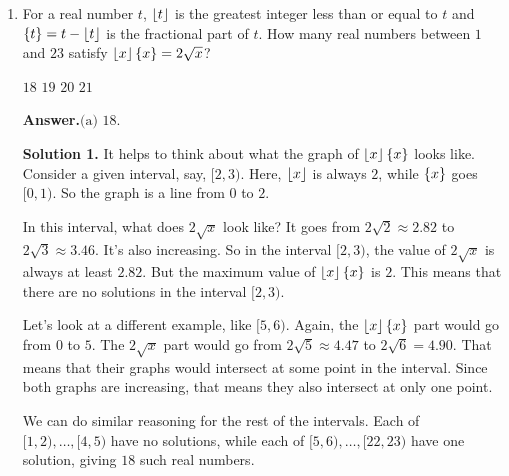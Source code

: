 \documentclass[11pt,paper=letter]{scrartcl}
\newcommand{\ansb}[2]{{\sffamily \bfseries Answer.}\;\(\boxed{\text{(#1) #2}}\).}
\newcommand{\soln}[1]{{\sffamily \bfseries Solution #1.}\;}
\newenvironment{rem}%
{\noindent \ignorespaces \small \sffamily \sansmath {\bfseries Remark.}}%
{\ignorespacesafterend}
\begin{document}
\begin{enumerate}[align=left,leftmargin=*]
\soln2 Either $r$ is even, which happens with probability $36\%$, or $r$ is odd, which must happen with probability $100\% - 36\% = 64\%$. These are related---$r$ is even is just like $r$ being odd, if you started counting after the first flip. That is, the probability $r$ is even is the probability that Alice doesn't get two heads in the first flip, times the probability that $r$ is odd. This means \[
  \frac{36}{100} = (1 - p^2)\frac{64}{100},
\]
and we can solve for $p = \frac{\sqrt7}{4}$.

\begin{rem}
Solution 2 uses the fact that $r$, being a geometric random variable, is \href{https://en.wikipedia.org/wiki/Memorylessness#Discrete_memorylessness}{memoryless}.
\end{rem}

\item For a real number $t$, $\left\lfloor t \right\rfloor$ is the greatest integer less than or equal to $t$ and $\left\{ t \right\} = t - \left\lfloor t \right\rfloor$ is the fractional part of $t$. How many real numbers between $1$ and $23$ satisfy $\left\lfloor x \right\rfloor\left\{ x \right\} = 2\sqrt{x}$?

\fourch
{$18$}
{$19$}
{$20$}
{$21$}

\ansb{a}{$18$}

\soln1 It helps to think about what the graph of $\left\lfloor x \right\rfloor\left\{ x \right\}$ looks like. Consider a given interval, say, $[2, 3)$. Here, $\left\lfloor x \right\rfloor$ is always $2$, while $\left\{ x \right\}$ goes $[0, 1)$. So the graph is a line from $0$ to $2$.

In this interval, what does $2\sqrt{x}$ look like? It goes from $2\sqrt{2} \approx 2.82$ to $2\sqrt{3} \approx 3.46$. It's also increasing. So in the interval $[2, 3)$, the value of $2\sqrt{x}$ is always at least $2.82$. But the maximum value of $\left\lfloor x \right\rfloor\left\{ x \right\}$ is $2$. This means that there are no solutions in the interval $[2, 3)$.

Let's look at a different example, like $[5, 6)$. Again, the $\left\lfloor x \right\rfloor\left\{ x \right\}$ part would go from $0$ to $5$. The $2\sqrt{x}$ part would go from $2\sqrt{5} \approx 4.47$ to $2\sqrt{6} = 4.90$. That means that their graphs would intersect at some point in the interval. Since both graphs are increasing, that means they also intersect at only one point.

We can do similar reasoning for the rest of the intervals. Each of $[1, 2), \ldots, [4, 5)$ have no solutions, while each of $[5, 6), \ldots, [22, 23)$ have one solution, giving $18$ such real numbers.


\end{enumerate}
\end{document}
